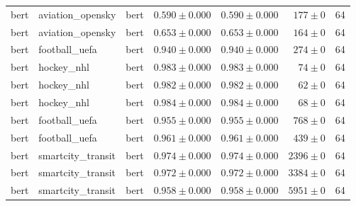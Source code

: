 \begin{table}[htbp]
\begin{tabular}{l l l r r r r}
bert & aviation\_opensky & bert & $0.590\pm0.000$ & $0.590\pm0.000$ & $177\pm0$ & 64 \\
bert & aviation\_opensky & bert & $0.653\pm0.000$ & $0.653\pm0.000$ & $164\pm0$ & 64 \\
bert & football\_uefa & bert & $0.940\pm0.000$ & $0.940\pm0.000$ & $274\pm0$ & 64 \\
bert & hockey\_nhl & bert & $0.983\pm0.000$ & $0.983\pm0.000$ & $74\pm0$ & 64 \\
bert & hockey\_nhl & bert & $0.982\pm0.000$ & $0.982\pm0.000$ & $62\pm0$ & 64 \\
bert & hockey\_nhl & bert & $0.984\pm0.000$ & $0.984\pm0.000$ & $68\pm0$ & 64 \\
bert & football\_uefa & bert & $0.955\pm0.000$ & $0.955\pm0.000$ & $768\pm0$ & 64 \\
bert & football\_uefa & bert & $0.961\pm0.000$ & $0.961\pm0.000$ & $439\pm0$ & 64 \\
bert & smartcity\_transit & bert & $0.974\pm0.000$ & $0.974\pm0.000$ & $2396\pm0$ & 64 \\
bert & smartcity\_transit & bert & $0.972\pm0.000$ & $0.972\pm0.000$ & $3384\pm0$ & 64 \\
bert & smartcity\_transit & bert & $0.958\pm0.000$ & $0.958\pm0.000$ & $5951\pm0$ & 64 \\
\hline
\end{tabular}
\end{table}
